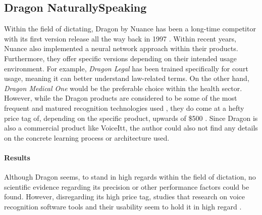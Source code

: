 \documentclass[draft,final]{vutinfth} %
\begin{document}
\subsection{Dragon NaturallySpeaking}
Within the field of dictating, Dragon by Nuance has been a long-time competitor with its first version release all the way back in 1997 \cite{mccrocklin2020revisiting}. Within recent years, Nuance also implemented a neural network approach within their products. Furthermore, they offer specific versions depending on their intended usage environment. For example, \emph{Dragon Legal} has been trained specifically for court usage, meaning it can better understand law-related terms. On the other hand,  \emph{Dragon Medical One} would be the preferable choice within the health sector. However, while the Dragon products are considered to be some of the most frequent and matured recognition technologies used \cite{shadiev2023review}, they do come at a hefty price tag of, depending on the specific product, upwards of \$500 \cite{Nuance}. Since Dragon is also a commercial product like VoiceItt, the author could also not find any details on the concrete learning process or architecture used.

\paragraph{Results}
Although Dragon seems,  to stand in high regards within the field of dictation, no scientific evidence regarding its precision or other performance factors could be found. However, disregarding its high price tag, studies that research on voice recognition software tools and their usability seem to hold it in high regard \cite{shadiev2023review, gandara2016voice}.
\end{document}

